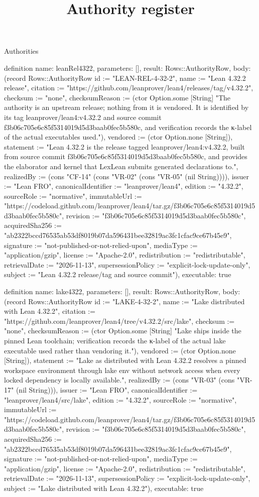 \begin{lexlean}{Authorities}
\title{Authority register}
\begin{semanticmodule}
definition{
  name: leanRel4322,
  parameters: [],
  result: Rows::AuthorityRow,
  body: (record Rows::AuthorityRow {id := "LEAN-REL-4-32-2", name := "Lean 4.32.2 release", citation := "https://github.com/leanprover/lean4/releases/tag/v4.32.2", checksum := "none", checksumReason := (ctor Option.some [String] "The authority is an upstream release; nothing from it is vendored. It is identified by its tag leanprover/lean4:v4.32.2 and source commit f3b06c705e6c85f5314019d5d3baab0fec5b580c, and verification records the κ-label of the actual executables used."), vendored := (ctor Option.none [String]), statement := "Lean 4.32.2 is the release tagged leanprover/lean4:v4.32.2, built from source commit f3b06c705e6c85f5314019d5d3baab0fec5b580c, and provides the elaborator and kernel that LexLean submits generated declarations to.", realizedBy := (cons "CF-14" (cons "VR-02" (cons "VR-05" (nil String)))), issuer := "Lean FRO", canonicalIdentifier := "leanprover/lean4", edition := "4.32.2", sourceRole := "normative", immutableUrl := "https://codeload.github.com/leanprover/lean4/tar.gz/f3b06c705e6c85f5314019d5d3baab0fec5b580c", revision := "f3b06c705e6c85f5314019d5d3baab0fec5b580c", acquiredSha256 := "ab2322bccd76535ab53df8019b07da596431bee32819ac3fc1cfac9ce67b45e9", signature := "not-published-or-not-relied-upon", mediaType := "application/gzip", license := "Apache-2.0", redistribution := "redistributable", retrievalDate := "2026-11-13", supersessionPolicy := "explicit-lock-update-only", subject := "Lean 4.32.2 release/tag and source commit"}),
  executable: true
}

definition{
  name: lake4322,
  parameters: [],
  result: Rows::AuthorityRow,
  body: (record Rows::AuthorityRow {id := "LAKE-4-32-2", name := "Lake distributed with Lean 4.32.2", citation := "https://github.com/leanprover/lean4/tree/v4.32.2/src/lake", checksum := "none", checksumReason := (ctor Option.some [String] "Lake ships inside the pinned Lean toolchain; verification records the κ-label of the actual lake executable used rather than vendoring it."), vendored := (ctor Option.none [String]), statement := "Lake as distributed with Lean 4.32.2 resolves a pinned workspace environment through lake env without network access when every locked dependency is locally available.", realizedBy := (cons "VR-03" (cons "VR-17" (nil String))), issuer := "Lean FRO", canonicalIdentifier := "leanprover/lean4/src/lake", edition := "4.32.2", sourceRole := "normative", immutableUrl := "https://codeload.github.com/leanprover/lean4/tar.gz/f3b06c705e6c85f5314019d5d3baab0fec5b580c", revision := "f3b06c705e6c85f5314019d5d3baab0fec5b580c", acquiredSha256 := "ab2322bccd76535ab53df8019b07da596431bee32819ac3fc1cfac9ce67b45e9", signature := "not-published-or-not-relied-upon", mediaType := "application/gzip", license := "Apache-2.0", redistribution := "redistributable", retrievalDate := "2026-11-13", supersessionPolicy := "explicit-lock-update-only", subject := "Lake distributed with Lean 4.32.2"}),
  executable: true
}


\end{semanticmodule}
\end{lexlean}

